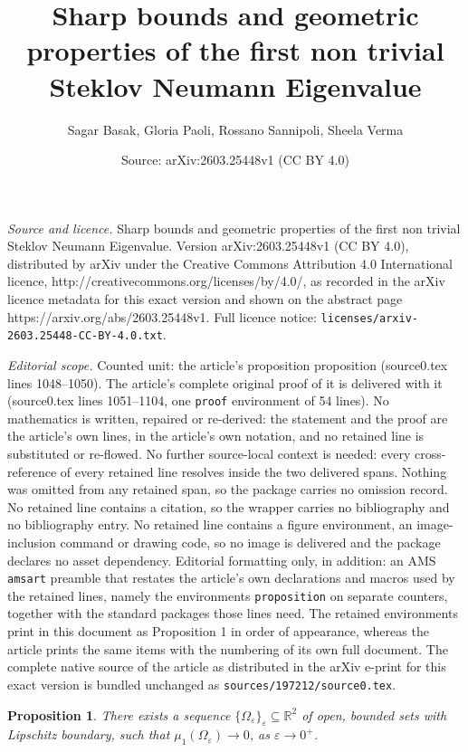 \documentclass[10pt,a4paper]{amsart}
\title{Sharp bounds and geometric properties of the first non trivial Steklov Neumann Eigenvalue}
\author{Sagar Basak, Gloria Paoli, Rossano Sannipoli, Sheela Verma}
\date{Source: arXiv:2603.25448v1 (CC BY 4.0)}
\newtheorem{proposition}{Proposition}
\begin{document}
\maketitle

\noindent\emph{Source and licence.} Sharp bounds and geometric properties of the first non trivial Steklov Neumann Eigenvalue. Version arXiv:2603.25448v1 (CC BY 4.0), distributed by arXiv under the Creative Commons Attribution 4.0 International licence, http://creativecommons.org/licenses/by/4.0/, as recorded in the arXiv licence metadata for this exact version and shown on the abstract page https://arxiv.org/abs/2603.25448v1. Full licence notice: \texttt{licenses/arxiv-2603.25448-CC-BY-4.0.txt}.\par\smallskip

\noindent\textit{Editorial scope.} Counted unit: the article's proposition proposition (source0.tex lines 1048--1050). The article's complete original proof of it is delivered with it (source0.tex lines 1051--1104, one \texttt{proof} environment of 54 lines). No mathematics is written, repaired or re-derived: the statement and the proof are the article's own lines, in the article's own notation, and no retained line is substituted or re-flowed.  No further source-local context is needed: every cross-reference of every retained line resolves inside the two delivered spans.  Nothing was omitted from any retained span, so the package carries no omission record.  No retained line contains a citation, so the wrapper carries no bibliography and no bibliography entry.  No retained line contains a figure environment, an image-inclusion command or drawing code, so no image is delivered and the package declares no asset dependency.  Editorial formatting only, in addition: an AMS \texttt{amsart} preamble that restates the article's own declarations and macros used by the retained lines, namely the environments \texttt{proposition} on separate counters, together with the standard packages those lines need.  The retained environments print in this document as Proposition 1 in order of appearance, whereas the article prints the same items with the numbering of its own full document.  The complete native source of the article as distributed in the arXiv e-print for this exact version is bundled unchanged as \texttt{sources/197212/source0.tex}.
\begin{proposition}
    There exists a sequence $\{\Omega_\varepsilon\}_{\varepsilon}\subseteq \mathbb R^2$ of open, bounded sets with Lipschitz boundary, such that $\mu_1(\Omega_\varepsilon)\to 0$, as $\varepsilon\to 0^+$.
\end{proposition}
\end{document}
